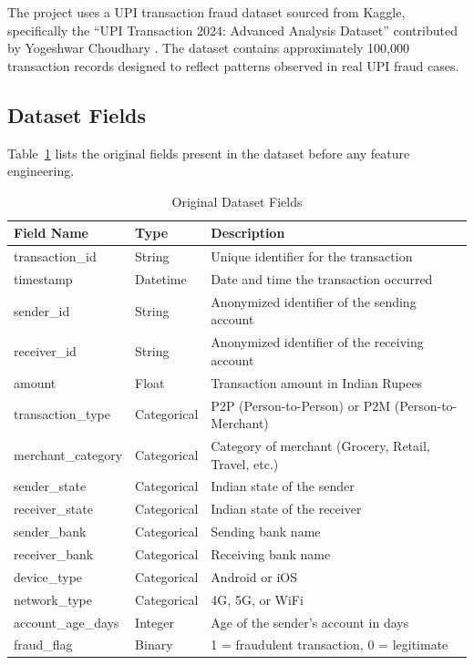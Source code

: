 The project uses a UPI transaction fraud dataset sourced from Kaggle, specifically the ``UPI Transaction 2024: Advanced Analysis Dataset'' contributed by Yogeshwar Choudhary \cite{kaggle2024}. The dataset contains approximately 100,000 transaction records designed to reflect patterns observed in real UPI fraud cases.

\subsection{Dataset Fields}

Table~\ref{tab:dataset_fields} lists the original fields present in the dataset before any feature engineering.

\begin{table}[H]
\centering
\caption{Original Dataset Fields}
\label{tab:dataset_fields}
\begin{tabular}{|l|l|p{6cm}|}
\hline
\textbf{Field Name} & \textbf{Type} & \textbf{Description}\\
\hline
transaction\_id & String & Unique identifier for the transaction\\
\hline
timestamp & Datetime & Date and time the transaction occurred\\
\hline
sender\_id & String & Anonymized identifier of the sending account\\
\hline
receiver\_id & String & Anonymized identifier of the receiving account\\
\hline
amount & Float & Transaction amount in Indian Rupees\\
\hline
transaction\_type & Categorical & P2P (Person-to-Person) or P2M (Person-to-Merchant)\\
\hline
merchant\_category & Categorical & Category of merchant (Grocery, Retail, Travel, etc.)\\
\hline
sender\_state & Categorical & Indian state of the sender\\
\hline
receiver\_state & Categorical & Indian state of the receiver\\
\hline
sender\_bank & Categorical & Sending bank name\\
\hline
receiver\_bank & Categorical & Receiving bank name\\
\hline
device\_type & Categorical & Android or iOS\\
\hline
network\_type & Categorical & 4G, 5G, or WiFi\\
\hline
account\_age\_days & Integer & Age of the sender's account in days\\
\hline
fraud\_flag & Binary & 1 = fraudulent transaction, 0 = legitimate\\
\hline
\end{tabular}
\end{table}

